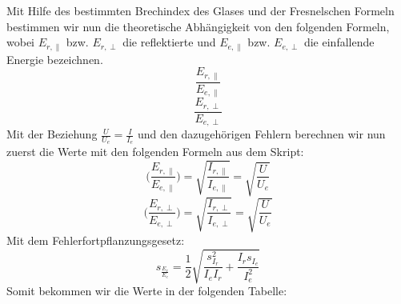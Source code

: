 Mit Hilfe des bestimmten Brechindex des Glases und der Fresnelschen Formeln bestimmen wir nun die theoretische Abhängigkeit von den folgenden Formeln, wobei $E_{r,\parallel}$ bzw. $E_{r,\perp}$ die reflektierte und $E_{e,\parallel}$ bzw. $E_{e,\perp}$ die einfallende Energie bezeichnen. 
\begin{equation}
\frac{E_{r,\parallel}}{E_{e,\parallel}}  
\end{equation}
\begin{equation}
\frac{E_{r,\perp}}{E_{e,\perp}}
\end{equation}
Mit der Beziehung $\frac{U}{U_e}=\frac{I}{I_e}$ und den dazugehörigen Fehlern berechnen wir nun zuerst die Werte mit den folgenden Formeln aus dem Skript:
\begin{equation}
\biggl( \frac{E_{r,\parallel}}{E_{e,\parallel}} \biggr)=\sqrt{\frac{I_{r,\parallel}}{I_{e,\parallel}}} = \sqrt{\frac{U}{U_e}}
\end{equation}
\begin{equation}
\biggl( \frac{E_{r,\perp}}{E_{e,\perp}} \biggr)=\sqrt{\frac{I_{r,\perp}}{I_{e,\perp}}}=\sqrt{\frac{U}{U_e}}
\end{equation}
Mit dem Fehlerfortpflanzungsgesetz:
\begin{equation}
s_{\frac{E_r}{E_e}}=\frac{1}{2}\sqrt{\frac{s^2_{I_r}}{I_eI_r}+\frac{I_rs_{I_e}}{I_e^2}}
\end{equation}
Somit bekommen wir die Werte in der folgenden Tabelle:
